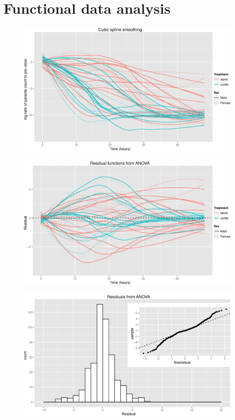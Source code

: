 \section{Functional data analysis}
\begin{figure}[h]
\includegraphics[width=150mm]{cubicspline.eps} 
\caption{}
\label{cubicspline}
\end{figure}
\begin{figure}[h]
\includegraphics[width=150mm]{fdaresids.eps} 
\caption{}
\label{fdaresids}
\end{figure}
\begin{figure}[h]
\includegraphics[width=150mm]{fdahistqq.eps} 
\caption{}
\label{fdahistqq}
\end{figure}
